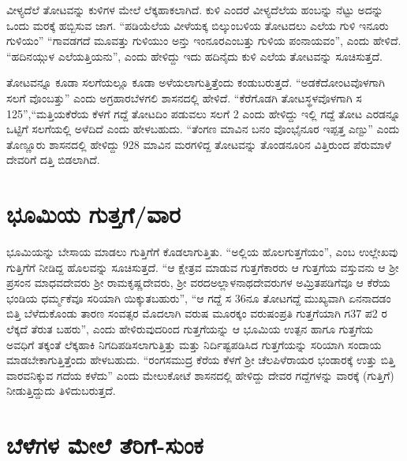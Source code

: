 ವೀಳ್ಯದೆಲೆ ತೋಟವನ್ನು ಕುಳಿಗಳ ಮೇಲೆ ಲೆಕ್ಕಹಾಕಲಾಗಿದೆ. ಕುಳಿ ಎಂದರೆ ವೀಳ್ಯದೆಲೆಯ ಹಂಬನ್ನು ನೆಟ್ಟು ಅದನ್ನು ಒಂದು ಮರಕ್ಕೆ ಹಬ್ಬಿಸುವ ಜಾಗ. “ಪಡಿಯೆಲೆಯ ವೀಳೆಯಕ್ಕ ಬಿಲ್ಕುಂಬಳಿಯ ತೋಟದಲು ಎಲೆಯ ಗುಳಿ ಇನೂರು ಗುಳಿಯಂ” “ಗಾವಡಗದೆ ಮೂವತ್ತು ಗುಳಿಯುಂ ಅನ್ತು ಇಂನೂರಎಂಬತ್ತು ಗುಳಿಯ ಪಂನಾಯವಂ”, ಎಂದು ಹೇಳಿದೆ. “ಹದಿನಯ್ಗುಳ ಎಲೆಯತ್ತಿಯನು”, ಎಂದು ಹೇಳಿದ್ದು ಇದು ಹದಿನೈದು ಕುಳಿ ಎಲೆಯ ತೋಟವನ್ನು ಸೂಚಿಸುತ್ತದೆ.

ತೋಟವನ್ನೂ ಕೂಡಾ ಸಲಗೆಯಲ್ಲೂ ಕೂಡಾ ಅಳೆಯಲಾಗುತ್ತಿತ್ತೆಂದು ಕಂಡುಬರುತ್ತದೆ. “ಅಡಕೆದೋಂಟವೊಳ\-ಗಾಗಿ ಸಲಗೆ ವೊಂಬತ್ತು” ಎಂದು ಅಗ್ರಹಾರಬೆಳಗಲಿ ಶಾಸನದಲ್ಲಿ ಹೇಳಿದೆ. “ಕೆರೆಗೊಡಗಿ ತೋಟಸ್ಥಳವೊಳಗಾಗಿ ಸ 125”,\break “ಮತ್ತಿಯಕೆರೆಯ ಕೆಳಗೆ ಗದ್ದೆ ತೋಟದಿಂ ಪಡುವಲು ಸಲಗೆ 2 ಎಂದು ಹೇಳಿದ್ದು ಇಲ್ಲಿ ಗದ್ದೆ ತೋಟ ಎರಡನ್ನೂ ಒಟ್ಟಿಗೆ ಸಲಗೆಯಲ್ಲಿ ಅಳೆದಿದೆ ಎಂದು ಹೇಳಬಹುದು. “ತೆಂಗಣ ಮಾವಿನ ಬನಂ ವೊಂಭೈನೂರ ಇಪ್ಪತ್ತ ಎಣ್ಟು” ಎಂದು ತೊಣ್ಣೂರು ಶಾಸನದಲ್ಲಿ ಹೇಳಿದ್ದು 928 ಮಾವಿನ ಮರಗಳಿದ್ದ ತೋಟವನ್ನು ತೊಂಡನೂರಿನ ವಿತ್ತಿರುಂದ ಪೆರುಮಾಳೆ ದೇವರಿಗೆ ದತ್ತಿ ಬಿಡಲಾಗಿದೆ.

\section{ಭೂಮಿಯ ಗುತ್ತಗೆ/ವಾರ}

ಭೂಮಿಯನ್ನು ಬೇಸಾಯ ಮಾಡಲು ಗುತ್ತಿಗೆಗೆ ಕೊಡಲಾಗುತ್ತಿತು. “ಅಲ್ಲಿಯ ಹೊಲಗುತ್ತಗೆಯಂ”, ಎಂಬ ಉಲ್ಲೇಖವು ಗುತ್ತಿಗೆಗೆ ನೀಡಿದ್ದ ಹೊಲವನ್ನು ಸೂಚಿಸುತ್ತದೆ. “ಆ ಕ್ಷೇತ್ರವ ಮಾಡುವ ಗುತ್ತಗೆಕಾರರು ಆ ಗುತ್ತಗೆಯ ವಸ್ತುವನು ಆ ಶ‍್ರೀ ಪ್ರಸಂನ ಮಾಧವದೇವರು ಶ‍್ರೀ ರಾಮಕೃಷ್ಣದೇವರು, ಶ‍್ರೀ ವರದಅಲ್ಲಾಳನಾಥದೇವರುಗಳ ಅಮ್ರಿತಪಡಿಗೆವೂ ಆ ಕೆರೆಯ ಭಂಡಿಯ ಧರ್ಮ್ಮಕೆವೂ ಸರಿಯಾಗಿ ಯಿಕ್ಕುತಬಹುರು”, “ಆ ಗದ್ದೆ ಸ 36ನೂ ತೋಟಗದ್ದೆ ಮುಖ್ಯವಾಗಿ ಏನನಾದಡಂ ಬಿತ್ತಿ ಬೆಳೆದುಕೊಂಡು ತಾರಣ ಸಂವತ್ಸರ ಮೊದಲಾಗಿ ವರುಷ ಮೂರಕ್ಕಂ ವರುಷಂಪ್ರತಿ ಗುತ್ತಗೆಯಾಗಿ ಗ37 ಪ2 ರ ಲೆಕ್ಕದೆ ತೆರುತ ಬಹರು”, ಎಂದು ಹೇಳಿರುವುದರಿಂದ ಗುತ್ತಗೆಯನ್ನು ಆ ಭೂಮಿಯ ಉತ್ಪನ ಹಾಗೂ ಗುತ್ತಗೆಯ ಅವಧಿಗೆ ತಕ್ಕಂತೆ ಲೆಕ್ಕಹಾಕಿ ನಿಗದಿಪಡಿಸಲಾಗುತ್ತಿತ್ತು ಮತ್ತು ನಿರ್ದಿಷ್ಟಪಡಿಸಿದ ಗುತ್ತಗೆಯನ್ನು ಸರಿಯಾಗಿ ಸಂದಾಯ ಮಾಡಬೇಕಾಗುತ್ತಿತ್ತೆಂದು ಹೇಳಬಹುದು. “ರಂಗಸಮುದ್ರ ಕೆರೆಯ ಕೆಳಗೆ ಶ‍್ರೀ ಚೆಲಪಿಳೆರಾಯರ ಭಂಡಾರಕ್ಕೆ ಉತ್ತು ಬಿತ್ತಿ ವಾರವನಿಕ್ಕುವ ಗದೆಯ ಕಳೆದು” ಎಂದು ಮೇಲುಕೋಟೆ ಶಾಸನದಲ್ಲಿ ಹೇಳಿದ್ದು ದೇವರ ಗದ್ದೆಗಳನ್ನು ವಾರಕ್ಕೆ (ಗುತ್ತಿಗೆ) ನೀಡುತ್ತಿದ್ದುದು ತಿಳಿದುಬರುತ್ತದೆ.

\section{ಬೆಳೆಗಳ ಮೇಲೆ ತೆರಿಗೆ-ಸುಂಕ}

